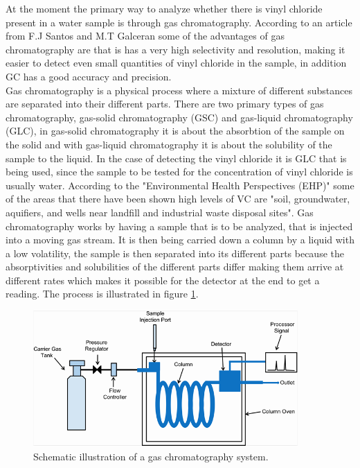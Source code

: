 \documentclass{article}
\begin{document}
At the moment the primary way to analyze whether there is vinyl chloride present in a water sample is through gas chromatography.
According to an article from F.J Santos and M.T Galceran some of the advantages of gas chromatography are that is has a very high selectivity and resolution, making it easier to detect even small quantities of vinyl chloride in the sample, in addition GC has a good accuracy and precision.\cite{SANTOS2002672}\\


Gas chromatography is a physical process where a mixture of different substances are separated into their different parts.\cite{waters_1978_gc}
There are two primary types of gas chromatography, gas-solid chromatography (GSC) and gas-liquid chromatography (GLC), in gas-solid chromatography it is about the absorbtion of the sample on the solid and with gas-liquid chromatography it is about the solubility of the sample to the liquid. \cite{ambrose_1963_gc}
In the case of detecting the vinyl chloride it is GLC that is being used, since the sample to be tested for the concentration of vinyl chloride is usually water.
According to the "Environmental Health Perspectives (EHP)" some of the areas that there have been shown high levels of VC are "soil, groundwater, aquifiers, and wells near landfill and industrial waste disposal sites"\cite{vc_kielhorn_2000}.
Gas chromatography works by having a sample that is to be analyzed, that is injected into a moving gas stream.
It is then being carried down a column by a liquid with a low volatility, the sample is then separated into its different parts because the absorptivities and solubilities of the different parts differ making them arrive at different rates which makes it possible for the detector at the end to get a reading.\cite{ambrose_1963_gc}
The process is illustrated in figure \ref{fig:glc_illustration}.

\begin{figure}[H]
    \centering
    \includegraphics[width=0.9\textwidth]{glc_illustration.png}
    \caption{Schematic illustration of a gas chromatography system. \cite{glc_illustration}}
    \label{fig:glc_illustration}
\end{figure}
\end{document}
